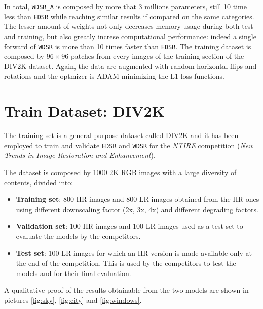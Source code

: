 \documentclass[12pt,a4paper]{report}
\begin{document}
In total, {\tt WDSR\_A} is composed by more that 3 millions parameters, still 10 time less than {\tt EDSR} while reaching similar results if compared on the same categories.
The lesser amount of weights not only decreases memory usage during both test and training, but also greatly increse computational performance: indeed a single forward of {\tt WDSR} is more than 10 times faster than {\tt EDSR}.
The training dataset is composed by $96 \times 96$ patches from every images of the training section of the DIV2K dataset. Again, the data are augmented with random horizontal flips and rotations and the optmizer is ADAM \cite{adam} minimizing the L1 loss functions.

\newpage

\section{Train Dataset: DIV2K}

The training set is a general purpose dataset called DIV2K \cite{DIV2K} and it has been employed to train and validate {\tt EDSR} and {\tt WDSR} for the {\it NTIRE} competition ({\it New Trends in Image Restoration and Enhancement}).

The dataset is composed by 1000 2K RGB images with a large diversity of contents, divided into:

\begin{itemize}
 \setlength\itemsep{-0.2em}
 \item {\bf Training set}: 800 HR images and 800 LR images obtained from the HR ones using different downscaling factor (2x, 3x, 4x) and different degrading factors.
 \item {\bf Validation set}: 100 HR images and 100 LR images used as a test set to evaluate the models by the competitors.
 \item {\bf Test set}: 100 LR images for which an HR version is made available only at the end of the competition. This is used by the competitors to test the models and for their final evaluation.
\end{itemize}

A qualitative proof of the results obtainable from the two models are shown in pictures \ref{fig:sky}, \ref{fig:city} and \ref{fig:windows}.
\end{document}
